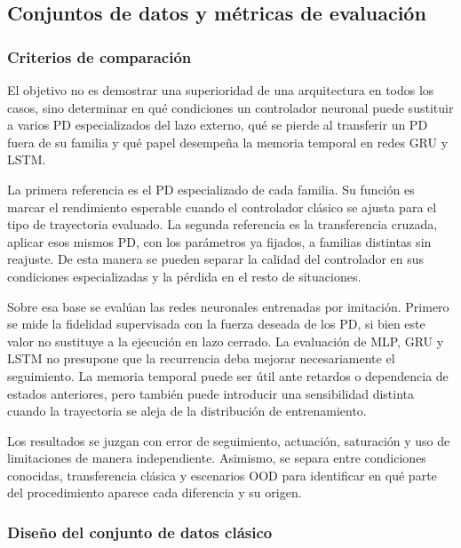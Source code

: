 \subsection{Conjuntos de datos y métricas de evaluación}
\label{subsec:datos-metricas}

\subsubsection*{Criterios de comparación}

El objetivo no es demostrar una superioridad de una arquitectura en todos los
casos, sino determinar en qué condiciones un controlador neuronal puede sustituir
a varios PD especializados del lazo externo, qué se pierde al transferir un PD
fuera de su familia y qué papel desempeña la memoria temporal en redes GRU y
LSTM.

La primera referencia es el PD especializado de cada familia. Su función es
marcar el rendimiento esperable cuando el controlador clásico se ajusta para el
tipo de trayectoria evaluado. La segunda referencia es la transferencia cruzada,
aplicar esos mismos PD, con los parámetros ya fijados, a familias distintas sin
reajuste. De esta manera se pueden separar la calidad del controlador en sus condiciones
especializadas y la pérdida en el resto de situaciones.

Sobre esa base se evalúan las redes neuronales entrenadas por imitación. Primero
se mide la fidelidad supervisada con la fuerza deseada de los PD, si bien este valor
no sustituye a la ejecución en lazo cerrado. La evaluación de MLP, GRU y LSTM no presupone
que la recurrencia deba mejorar necesariamente el seguimiento. La memoria temporal puede ser
útil ante retardos o dependencia de estados anteriores, pero también puede introducir una
sensibilidad distinta cuando la trayectoria se aleja de la distribución de entrenamiento.

Los resultados se juzgan con error de seguimiento, actuación, saturación y uso de
limitaciones de manera independiente. Asimismo, se separa entre condiciones conocidas,
transferencia clásica y escenarios OOD para identificar en qué parte del procedimiento
aparece cada diferencia y su origen.

\subsubsection*{Diseño del conjunto de datos clásico}
\label{subsubsec:diseno-dataset-clasico}

